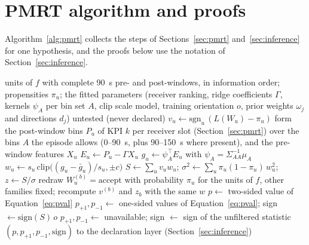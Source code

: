 \FloatBarrier
\section{PMRT algorithm and proofs}
\label{app:proof}

Algorithm~\ref{alg:pmrt} collects the steps of Sections~\ref{sec:pmrt} and~\ref{sec:inference} for one hypothesis,
and the proofs below use the notation of Section~\ref{sec:inference}.

\begin{algorithm}
\caption{PMRT for family $f$ and hypothesis $(f, r, k)$}
\label{alg:pmrt}
\begin{algorithmic}[1]
\Require units of $f$ with complete 90~s pre- and post-windows, in information order; propensities $\pi_u$; the fitted parameters (receiver ranking, ridge coefficients $\Gamma$, kernels $\psi_A$ per bin set $A$, clip scale model, training orientation $o$, prior weights $\omega_j$ and directions $d_j$)
  \State \Return untested (never declared)
\EndIf
{}
  \State $v_u \gets \mathrm{sgn}_u\,(L(W_u) - \pi_u)$ 
  \State form the post-window bins $P_u$ of KPI $k$ per receiver slot (Section~\ref{sec:pmrt}) over the bins $A$ the episode allows (0--90~s, plus 90--150~s where present), and the pre-window features $X_u$
  \State $E_u \gets P_u - \Gamma X_u$ 
  \State $g_u \gets \psi_A^{\top} E_u$ with $\psi_A = \Sigma_{AA}^{-1} \mu_A$ 
  \State $w_u \gets s_u\,\mathrm{clip}\bigl((g_u - \bar g_u) / s_u, \pm c\bigr)$ 
\EndFor
\State $S \gets \sum_u v_u w_u$;\; $\sigma^2 \gets \sum_u \pi_u (1 - \pi_u)\, w_u^2$;\; $z \gets S / \sigma$ 
  \State redraw $W_u^{(b)} = \text{accept}$ with probability $\pi_u$ for the units of $f$, other families fixed; recompute $v^{(b)}$ and $z_b$ with the same $w$
\EndFor
\State $p \gets$ two-sided value of Equation~\eqref{eq:pval}
  \State $p_{+1}, p_{-1} \gets$ one-sided values of Equation~\eqref{eq:pval};\; sign $\gets \mathrm{sign}(S)\, o$
\Else
  \State $p_{+1}, p_{-1} \gets$ unavailable;\; sign $\gets$ sign of the unfiltered statistic
\EndIf
\State \Return $(p, p_{+1}, p_{-1}, \text{sign})$ to the declaration layer (Section~\ref{sec:inference})
\end{algorithmic}
\end{algorithm}

